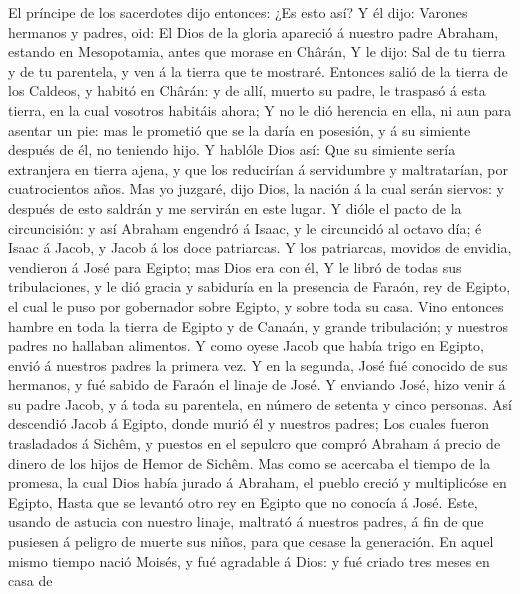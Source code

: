  El príncipe de los sacerdotes dijo entonces: ¿Es esto
así?  Y él dijo: Varones hermanos y padres, oid: El Dios
de la gloria apareció á nuestro padre Abraham, estando en Mesopotamia,
antes que morase en Chârán,  Y le dijo: Sal de tu tierra y
de tu parentela, y ven á la tierra que te mostraré. 
Entonces salió de la tierra de los Caldeos, y habitó en Chârán: y de
allí, muerto su padre, le traspasó á esta tierra, en la cual vosotros
habitáis ahora;  Y no le dió herencia en ella, ni aun para
asentar un pie: mas le prometió que se la daría en posesión, y á su
simiente después de él, no teniendo hijo.  Y hablóle Dios
así: Que su simiente sería extranjera en tierra ajena, y que los
reducirían á servidumbre y maltratarían, por cuatrocientos años.
 Mas yo juzgaré, dijo Dios, la nación á la cual serán
siervos: y después de esto saldrán y me servirán en este lugar.
 Y dióle el pacto de la circuncisión: y así Abraham
engendró á Isaac, y le circuncidó al octavo día; é Isaac á Jacob, y
Jacob á los doce patriarcas.  Y los patriarcas, movidos de
envidia, vendieron á José para Egipto; mas Dios era con él,
 Y le libró de todas sus tribulaciones, y le dió gracia y
sabiduría en la presencia de Faraón, rey de Egipto, el cual le puso por
gobernador sobre Egipto, y sobre toda su casa.  Vino
entonces hambre en toda la tierra de Egipto y de Canaán, y grande
tribulación; y nuestros padres no hallaban alimentos.  Y
como oyese Jacob que había trigo en Egipto, envió á nuestros padres la
primera vez.  Y en la segunda, José fué conocido de sus
hermanos, y fué sabido de Faraón el linaje de José.  Y
enviando José, hizo venir á su padre Jacob, y á toda su parentela, en
número de setenta y cinco personas.  Así descendió Jacob
á Egipto, donde murió él y nuestros padres;  Los cuales
fueron trasladados á Sichêm, y puestos en el sepulcro que compró Abraham
á precio de dinero de los hijos de Hemor de Sichêm.  Mas
como se acercaba el tiempo de la promesa, la cual Dios había jurado á
Abraham, el pueblo creció y multiplicóse en Egipto, 
Hasta que se levantó otro rey en Egipto que no conocía á José.
 Este, usando de astucia con nuestro linaje, maltrató á
nuestros padres, á fin de que pusiesen á peligro de muerte sus niños,
para que cesase la generación.  En aquel mismo tiempo
nació Moisés, y fué agradable á Dios: y fué criado tres meses en casa de
